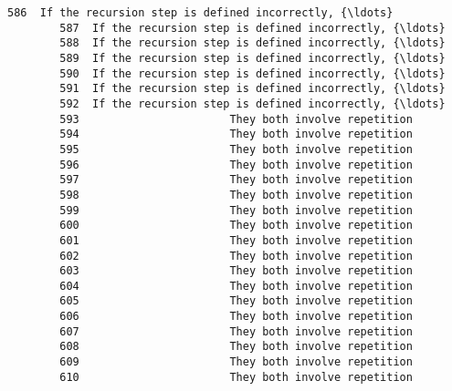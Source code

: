 \documentclass[11pt]{article}
\begin{document}
\begin{Verbatim}[commandchars=\\\{\}]
        586  If the recursion step is defined incorrectly, {\ldots}   
        587  If the recursion step is defined incorrectly, {\ldots}   
        588  If the recursion step is defined incorrectly, {\ldots}   
        589  If the recursion step is defined incorrectly, {\ldots}   
        590  If the recursion step is defined incorrectly, {\ldots}   
        591  If the recursion step is defined incorrectly, {\ldots}   
        592  If the recursion step is defined incorrectly, {\ldots}   
        593                       They both involve repetition   
        594                       They both involve repetition   
        595                       They both involve repetition   
        596                       They both involve repetition   
        597                       They both involve repetition   
        598                       They both involve repetition   
        599                       They both involve repetition   
        600                       They both involve repetition   
        601                       They both involve repetition   
        602                       They both involve repetition   
        603                       They both involve repetition   
        604                       They both involve repetition   
        605                       They both involve repetition   
        606                       They both involve repetition   
        607                       They both involve repetition   
        608                       They both involve repetition   
        609                       They both involve repetition   
        610                       They both involve repetition   
        

\end{Verbatim}
\end{document}
